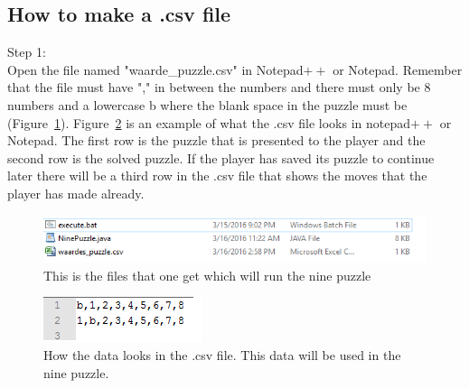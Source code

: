 \documentclass[10pt]{article}
\begin{document}
\subsection{How to make a .csv file}
Step 1:
\\Open the file named "waarde\_puzzle.csv" in Notepad$++$ or Notepad.
Remember that the file must have "," in between the numbers and there must only be 8 numbers and a lowercase b where the blank space in the puzzle must be (Figure~\ref{csv}).
Figure~\ref{waardes} is an example of what the .csv file looks in notepad$++$ or Notepad. The first row is the puzzle that is presented to the player and the second row is the solved puzzle.  If the player has saved its puzzle to continue later there will be a third row in the .csv file that shows the moves that the player has made already.
\begin{figure}
\centering
\includegraphics[scale=0.7]{./Prente/csv.png}
\caption{This is the files that one get which will run the nine puzzle}
\label{csv}
\end{figure}
\begin{figure}
\centering
\includegraphics[scale=1]{./Prente/waardes.png}
\caption{How the data looks in the .csv file.  This data will be used in the nine puzzle.}
\label{waardes}
\end{figure}
\end{document}
